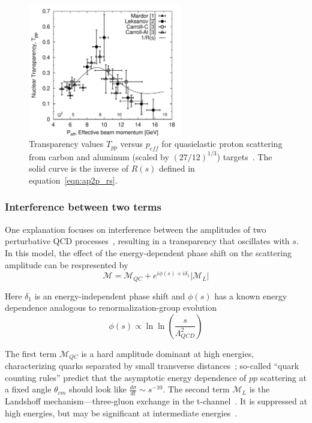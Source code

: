 \begin{figure}[!h]
    \centering
    \includegraphics[width=0.6\textwidth]{chap2/ap2p.pdf}
    \caption{Transparency values $T_{pp}$ versus $p_{eff}$ for quasielastic
             proton scattering from carbon and aluminum (scaled by
             $(27/12)^{1/3}$) targets~\cite{Aclander_2004}.
             The solid curve is the inverse of $R(s)$ defined in
             equation~\ref{eqn:ap2p_rs}.
            }
    \label{fig:ap2p}
\end{figure}

\subsubsection{Interference between two terms}
One explanation focuses on interference between the amplitudes of two
perturbative QCD processes~\cite{Ralston_1988}, resulting in a transparency
that oscillates with $s$.
In this model, the effect of the energy-dependent phase shift on the scattering
amplitude can be respresented by
\begin{equation}
    \mathcal{M} = \mathcal{M}_{QC} + e^{i\phi(s) + i \delta_1}\left|\mathcal{M}_L\right|
\end{equation}

Here $\delta_1$ is an energy-independent phase shift and $\phi(s)$ has a known
energy dependence analogous to renormalization-group
evolution~\cite{Pire_1982, Ralston_1982, Sen_1983}
\begin{equation}
    \phi(s) \propto \ln \ln \left( \frac{s}{\Lambda_{QCD}^2} \right)
\end{equation}


The first term $\mathcal{M}_{QC}$ is a hard amplitude dominant at high energies,
characterizing quarks separated by small transverse
distances~\cite{Brodsky_1973, Brodsky_1975, Matveev_1973, Lepage_1980};
so-called ``quark counting rules'' predict that the asymptotic energy
dependence of $pp$ scattering at a fixed angle $\theta_{cm}$ should look like
$\frac{d\sigma}{dt}\sim s^{-10}$.
The second term $\mathcal{M}_L$ is the Landshoff mechanism---three-gluon exchange in the
t-channel~\cite{Landshoff_1974, Landshoff_1980}.
It is suppressed at high energies, but may be significant at intermediate
energies~\cite{Mueller_1981}.


